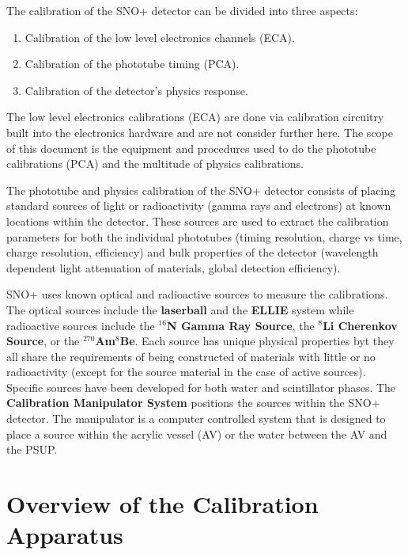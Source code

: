 



The calibration of the SNO+ detector can be divided into three
aspects:
\begin{enumerate}
\item Calibration of the low level electronics channels (ECA).
\item Calibration of the phototube timing (PCA).
\item Calibration of the detector's physics response.
\end{enumerate}
The low level electronics calibrations (ECA) are done via calibration
circuitry built into the electronics hardware and are not consider
further here. The scope of this document is the equipment and
procedures used to do the phototube calibrations (PCA) and the
multitude of physics calibrations.

The phototube and physics calibration of the SNO+ detector consists of
placing standard sources of light or radioactivity (gamma rays and
electrons) at known locations within the detector. These sources are
used to extract the calibration parameters for both the individual
phototubes (timing resolution, charge vs time, charge resolution,
efficiency) and bulk properties of the detector (wavelength dependent
light attenuation of materials, global detection efficiency).

SNO+ uses known optical and radioactive sources to measure the
calibrations. The optical sources include the \textbf{laserball} and
the \textbf{ELLIE} system while radioactive sources include the
\textbf{$^{16}$N Gamma Ray Source}, the \textbf{$^{8}$Li Cherenkov
  Source}, or the \textbf{$^{270}$Am$^{8}$Be}. Each source has unique
physical properties byt they all share the requirements of being
constructed of materials with little or no radioactivity (except for
the source material in the case of active sources). Specific sources
have been developed for both water and scintillator phases. The
\textbf{Calibration Manipulator System} positions the sources within
the SNO+ detector. The manipulator is a computer controlled system
that is designed to place a source within the acrylic vessel (AV) or
the water between the AV and the PSUP.

\section{Overview of the Calibration Apparatus}

